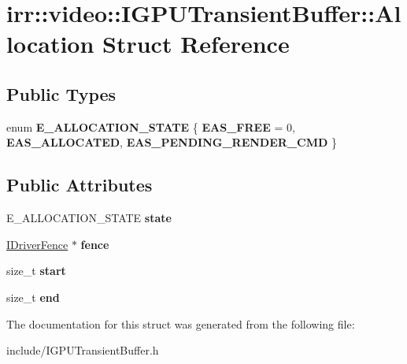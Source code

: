 \hypertarget{structirr_1_1video_1_1IGPUTransientBuffer_1_1Allocation}{}\section{irr\+:\+:video\+:\+:I\+G\+P\+U\+Transient\+Buffer\+:\+:Allocation Struct Reference}
\label{structirr_1_1video_1_1IGPUTransientBuffer_1_1Allocation}
\subsection*{Public Types}
\begin{DoxyCompactItemize}
\item 
enum {\bfseries E\+\_\+\+A\+L\+L\+O\+C\+A\+T\+I\+O\+N\+\_\+\+S\+T\+A\+TE} \{ {\bfseries E\+A\+S\+\_\+\+F\+R\+EE} = 0, 
{\bfseries E\+A\+S\+\_\+\+A\+L\+L\+O\+C\+A\+T\+ED}, 
{\bfseries E\+A\+S\+\_\+\+P\+E\+N\+D\+I\+N\+G\+\_\+\+R\+E\+N\+D\+E\+R\+\_\+\+C\+MD}
 \}\hypertarget{structirr_1_1video_1_1IGPUTransientBuffer_1_1Allocation_ac5fce6ac37061c123a637c68de7d2c66}{}\label{structirr_1_1video_1_1IGPUTransientBuffer_1_1Allocation_ac5fce6ac37061c123a637c68de7d2c66}

\end{DoxyCompactItemize}
\subsection*{Public Attributes}
\begin{DoxyCompactItemize}
\item 
E\+\_\+\+A\+L\+L\+O\+C\+A\+T\+I\+O\+N\+\_\+\+S\+T\+A\+TE {\bfseries state}\hypertarget{structirr_1_1video_1_1IGPUTransientBuffer_1_1Allocation_a1c8c009cea664473cca32876def0c926}{}\label{structirr_1_1video_1_1IGPUTransientBuffer_1_1Allocation_a1c8c009cea664473cca32876def0c926}

\item 
\hyperlink{classirr_1_1video_1_1IDriverFence}{I\+Driver\+Fence} $\ast$ {\bfseries fence}\hypertarget{structirr_1_1video_1_1IGPUTransientBuffer_1_1Allocation_ab3ea29d700b6d6c87f72803b19095114}{}\label{structirr_1_1video_1_1IGPUTransientBuffer_1_1Allocation_ab3ea29d700b6d6c87f72803b19095114}

\item 
size\+\_\+t {\bfseries start}\hypertarget{structirr_1_1video_1_1IGPUTransientBuffer_1_1Allocation_af50768aa78dc4b59fb31d9a051a66eea}{}\label{structirr_1_1video_1_1IGPUTransientBuffer_1_1Allocation_af50768aa78dc4b59fb31d9a051a66eea}

\item 
size\+\_\+t {\bfseries end}\hypertarget{structirr_1_1video_1_1IGPUTransientBuffer_1_1Allocation_a5b6d28c666960cddac2de9e38c8b1ea8}{}\label{structirr_1_1video_1_1IGPUTransientBuffer_1_1Allocation_a5b6d28c666960cddac2de9e38c8b1ea8}

\end{DoxyCompactItemize}


The documentation for this struct was generated from the following file\+:\begin{DoxyCompactItemize}
\item 
include/I\+G\+P\+U\+Transient\+Buffer.\+h\end{DoxyCompactItemize}
